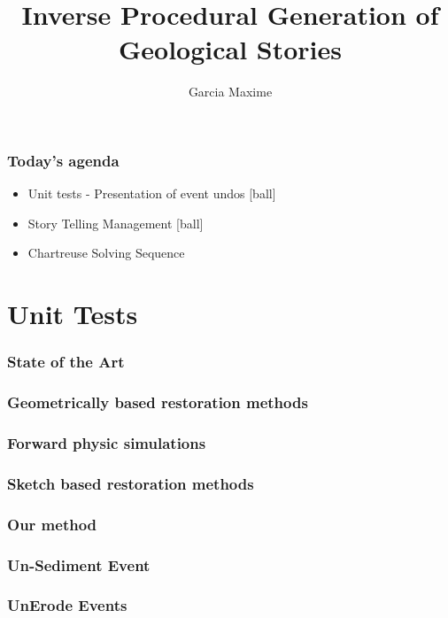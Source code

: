 \documentclass{beamer}
\title[Master of Science in Informatics at Grenoble: Master Thesis Defence]{Inverse Procedural Generation of Geological Stories}
\author{Garcia Maxime}
\begin{document}
	
    \begin{frame}[label=(intro)]
	\titlepage
    \end{frame}
	
	
	\begin{frame}
	\frametitle{Today's agenda}
	\begin{itemize}
	[ball]
	\item Unit tests - Presentation of event undos
	[ball]
	\item Story Telling Management
	[ball]
	\item Chartreuse Solving Sequence
	\end{itemize}
	\end{frame}
	
	
	\section{Unit Tests}
	
	\begin{frame}
	\frametitle{State of the Art}
    \end{frame}

	\begin{frame}
	\frametitle{Geometrically based restoration methods}
    \end{frame}    
    
    \begin{frame}
	\frametitle{Forward physic simulations}
    \end{frame}
    
    \begin{frame}
	\frametitle{Backward physic simulations
    \end{frame}
    
    \begin{frame}
	\frametitle{Sketch based restoration methods}
    \end{frame}
    
	\begin{frame}
	\frametitle{Our method}
	\end{frame}
	
		
	\begin{frame}
	\frametitle{Un-Sediment Event}
	\end{frame}	
	
	
	\begin{frame}
	\frametitle{UnErode Events}
	\end{frame}
\end{document}
